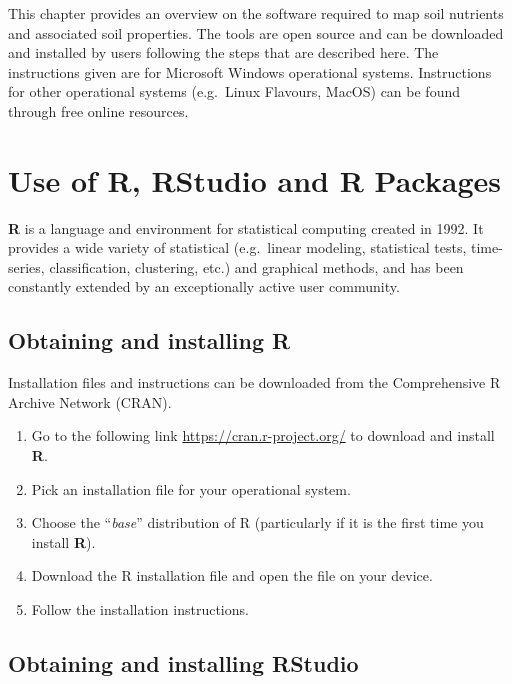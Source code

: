\documentclass[
  10pt,
  b5paper,
  oneside]{book}
\providecommand{\tightlist}{%
  \setlength{\itemsep}{0pt}\setlength{\parskip}{0pt}}
\begin{document}
This chapter provides an overview on the software required to map soil nutrients and associated soil properties. The tools are open source and can be downloaded and installed by users following the steps that are described here. The instructions given are for Microsoft Windows operational systems. Instructions for other operational systems (e.g.~Linux Flavours, MacOS) can be found through free online resources.

\hypertarget{use-of-r-rstudio-and-r-packages}{%
\section{Use of R, RStudio and R Packages}\label{use-of-r-rstudio-and-r-packages}}

\textbf{R} is a language and environment for statistical computing created in 1992. It provides a wide variety of statistical (e.g.~linear modeling, statistical tests, time-series, classification, clustering, etc.) and graphical methods, and has been constantly extended by an exceptionally active user community.

\hypertarget{obtaining-and-installing-r}{%
\subsection{Obtaining and installing R}\label{obtaining-and-installing-r}}

Installation files and instructions can be downloaded from the Comprehensive R Archive Network (CRAN).

\begin{enumerate}
\def\labelenumi{\arabic{enumi}.}
\tightlist
\item
  Go to the following link \url{https://cran.r-project.org/} to download and install \textbf{R}.
\item
  Pick an installation file for your operational system.
\item
  Choose the ``\emph{base}'' distribution of R (particularly if it is the first time you install \textbf{R}).
\item
  Download the R installation file and open the file on your device.
\item
  Follow the installation instructions.
\end{enumerate}

\hypertarget{obtaining-and-installing-rstudio}{%
\subsection{Obtaining and installing RStudio}\label{obtaining-and-installing-rstudio}}
\end{document}
